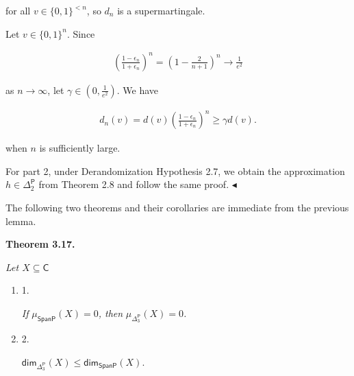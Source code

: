 for all $v\in\{0,1\}^{<n}$, so $d_{n}$ is a supermartingale.\par




Let $v\in\{0,1\}^{n}$. Since\par


\[\begin{gathered}
\left(\frac{1-\epsilon_{n}}{1+\epsilon_{n}}\right)^{n}=\left(1-\frac{2}{n+1}\right)^{n}\to\frac{1}{e^{2}}
\end{gathered}\]


as $n\to\infty$, let $\gamma\in(0,\tfrac{1}{e^{2}})$.
We have\par


\[\begin{gathered}
d_{n}(v)=d(v)\left(\frac{1-\epsilon_{n}}{1+\epsilon_{n}}\right)^{n}\geq\gamma d(v).
\end{gathered}\]


when $n$ is sufficiently large.\par




For part 2, under Derandomization Hypothesis 2.7, we obtain the approximation $h\in{\Delta^{\mathsf{P}}_{2}}$ from Theorem 2.8 and follow the same proof.
$\blacktriangleleft$\par




The following two theorems and their corollaries are immediate from the previous lemma.\par





\par\medskip\noindent\textbf{
\textbf{Theorem 3.17}\textbf{.}
}\par



\emph{Let $X\subseteq\mathsf{C}$}\par


\begin{enumerate}


\item[] 
1. 


\emph{If }$\mu_{\mathsf{SpanP}}(X)=0$\emph{, then }$\mu_{\Delta^{\mathsf{P}}_{3}}(X)=0$\emph{.}\par





\item[] 
2. 


${\mathsf{dim}}_{\Delta^{\mathsf{P}}_{3}}(X)\leq{\mathsf{dim}}_{\mathsf{SpanP}}(X).$\emph{}\par





\end{enumerate}



